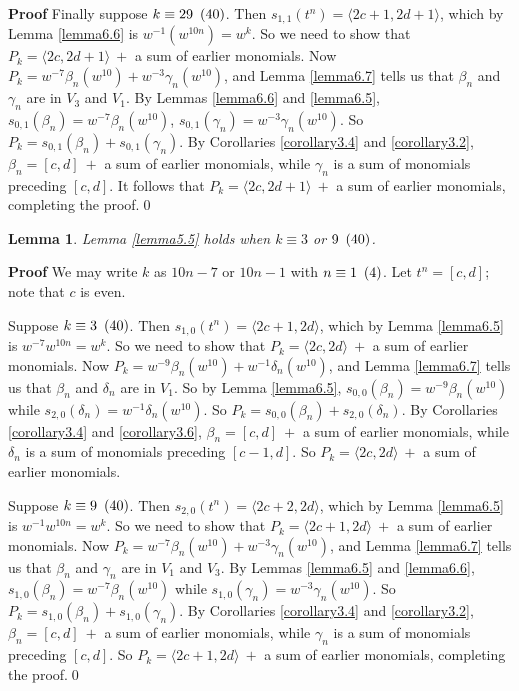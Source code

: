 \documentclass{monsky2009}
\newenvironment{proof}[1][]{\textbf{Proof #1\hspace{.3em}}}{}
\newtheorem{lemma}[definition]{Lemma}
\newcommand{\mod}[1]{\ensuremath{\hspace{.5em}(#1)}}
\begin{document}
\begin{proof}
Finally suppose $k\equiv 29\mod{40}$. Then $s_{1,1}(t^{n})=\langle 2c+1,2d+1\rangle$, which by Lemma \ref{lemma6.6} is $w^{-1}(w^{10n})=w^{k}$. So we need to show that $P_{k}=\langle 2c,2d+1\rangle \ +$ a sum of earlier monomials. Now $P_{k}=w^{-7}\beta_{n}(w^{10})+w^{-3}\gamma_{n}(w^{10})$, and Lemma \ref{lemma6.7} tells us that $\beta_{n}$ and $\gamma_{n}$ are in $V_{3}$ and $V_{1}$. By Lemmas \ref{lemma6.6} and \ref{lemma6.5}, $s_{0,1}(\beta_{n})=w^{-7}\beta_{n}(w^{10})$,   $s_{0,1}(\gamma_{n})=w^{-3}\gamma_{n}(w^{10})$. So $P_{k}=s_{0,1}(\beta_{n})+s_{0,1}(\gamma_{n})$. By Corollaries \ref{corollary3.4} and \ref{corollary3.2}, $\beta_{n}=[c,d]\ +$ a sum of earlier monomials, while $\gamma_{n}$ is a sum of monomials preceding $[c,d]$. It follows that $P_{k}=\langle 2c,2d+1\rangle\ +$ a sum of earlier monomials, completing the proof.\qed
\end{proof}

\begin{lemma}%
\label{lemma7.2}
Lemma \ref{lemma5.5} holds when $k\equiv 3$ or $9\mod{40}$.
\end{lemma}

\begin{proof}
We may write $k$ as $10n-7$ or $10n-1$ with $n\equiv 1\mod{4}$. Let $t^{n}=[c,d]$; note that $c$ is even.

Suppose $k\equiv 3\mod{40}$. Then $s_{1,0}(t^{n})=\langle 2c+1,2d\rangle$, which by Lemma \ref{lemma6.5} is $w^{-7}w^{10n}=w^{k}$. So we need to show that $P_{k}=\langle 2c,2d\rangle \ +$ a sum of earlier monomials. Now $P_{k}=w^{-9}\beta_{n}(w^{10})+w^{-1}\delta_{n}(w^{10})$, and Lemma \ref{lemma6.7} tells us that $\beta_{n}$ and $\delta_{n}$ are in $V_{1}$. So by Lemma \ref{lemma6.5}, $s_{0,0}(\beta_{n})=w^{-9}\beta_{n}(w^{10})$ while $s_{2,0}(\delta_{n})=w^{-1}\delta_{n}(w^{10})$. So $P_{k}=s_{0,0}(\beta_{n})+s_{2,0}(\delta_{n})$. By Corollaries \ref{corollary3.4} and \ref{corollary3.6}, $\beta_{n}=[c,d]\ +$ a sum of earlier monomials, while $\delta_{n}$ is a sum of monomials preceding $[c-1,d]$. So $P_{k}=\langle 2c,2d\rangle \ +$ a sum of earlier monomials. 

Suppose $k\equiv 9\mod{40}$. Then $s_{2,0}(t^{n})=\langle 2c+2,2d\rangle$, which by Lemma \ref{lemma6.5} is $w^{-1}w^{10n}=w^{k}$. So we need to show that $P_{k}=\langle 2c+1,2d\rangle \ +$ a sum of earlier monomials. Now $P_{k}=w^{-7}\beta_{n}(w^{10})+w^{-3}\gamma_{n}(w^{10})$, and Lemma \ref{lemma6.7} tells us that $\beta_{n}$ and $\gamma_{n}$ are in $V_{1}$ and $V_{3}$. By Lemmas \ref{lemma6.5} and \ref{lemma6.6}, $s_{1,0}(\beta_{n})=w^{-7}\beta_{n}(w^{10})$ while $s_{1,0}(\gamma_{n})=w^{-3}\gamma_{n}(w^{10})$. So $P_{k}=s_{1,0}(\beta_{n})+s_{1,0}(\gamma_{n})$. By Corollaries \ref{corollary3.4} and \ref{corollary3.2}, $\beta_{n}=[c,d]\ +$ a sum of earlier monomials, while $\gamma_{n}$ is a sum of monomials preceding $[c,d]$. So $P_{k}=\langle 2c+1,2d\rangle\ +$ a sum of earlier monomials, completing the proof.\qed
\end{proof}
\end{document}
